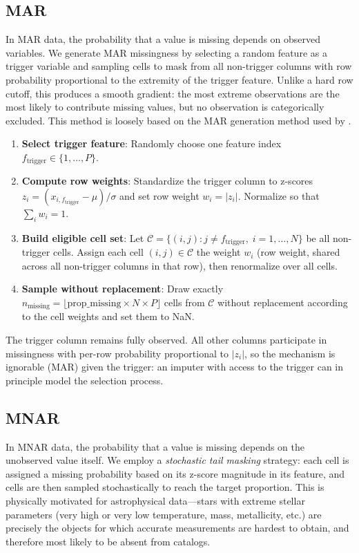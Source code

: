 \documentclass[preprint]{aastex631}
\begin{document}
\subsection{MAR}

In MAR data, the probability that a value is missing depends on observed variables. We generate MAR missingness by selecting a random feature as a trigger variable and sampling cells to mask from all non-trigger columns with row probability proportional to the extremity of the trigger feature. Unlike a hard row cutoff, this produces a smooth gradient: the most extreme observations are the most likely to contribute missing values, but no observation is categorically excluded. This method is loosely based on the MAR generation method used by \citet{toyeBenchmarkingMissingData2025}.

\begin{enumerate}
  \item \textbf{Select trigger feature}: Randomly choose one feature index $f_{\text{trigger}} \in \{1, \ldots, P\}$.
  \item \textbf{Compute row weights}: Standardize the trigger column to z-scores $z_i = (x_{i,f_{\text{trigger}}} - \mu) / \sigma$ and set row weight $w_i = |z_i|$. Normalize so that $\sum_i w_i = 1$.
  \item \textbf{Build eligible cell set}: Let $\mathcal{C} = \{(i, j) : j \neq f_{\text{trigger}},\; i = 1, \ldots, N\}$ be all non-trigger cells. Assign each cell $(i, j) \in \mathcal{C}$ the weight $w_i$ (row weight, shared across all non-trigger columns in that row), then renormalize over all cells.
  \item \textbf{Sample without replacement}: Draw exactly $n_{\text{missing}} = \lfloor \text{prop\_missing} \times N \times P \rfloor$ cells from $\mathcal{C}$ without replacement according to the cell weights and set them to NaN.
\end{enumerate}

The trigger column remains fully observed. All other columns participate in missingness with per-row probability proportional to $|z_i|$, so the mechanism is ignorable (MAR) given the trigger: an imputer with access to the trigger can in principle model the selection process.

\subsection{MNAR}

In MNAR data, the probability that a value is missing depends on the unobserved value itself. We employ a \emph{stochastic tail masking} strategy: each cell is assigned a missing probability based on its z-score magnitude in its feature, and cells are then sampled stochastically to reach the target proportion. This is physically motivated for astrophysical data---stars with extreme stellar parameters (very high or very low temperature, mass, metallicity, etc.) are precisely the objects for which accurate measurements are hardest to obtain, and therefore most likely to be absent from catalogs.
\end{document}
